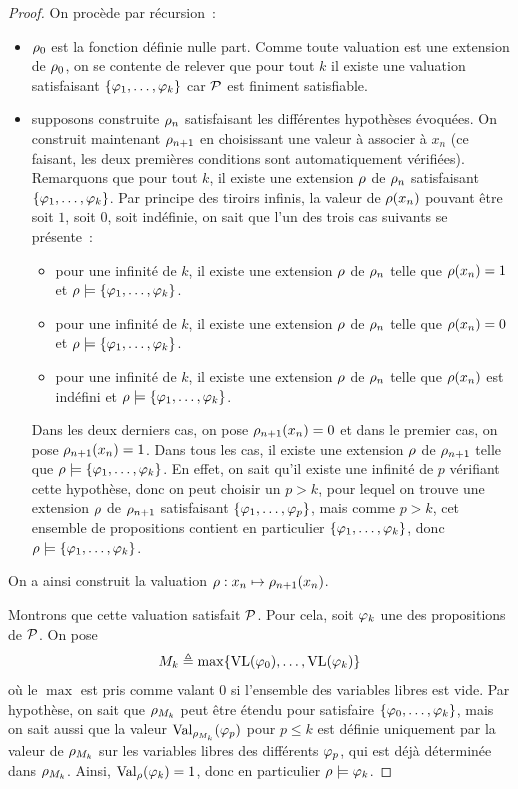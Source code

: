 \begin{proof}
  \noindent
  On procède par récursion~:
  \begin{itemize}
  \item $\rho_0$ est la fonction définie nulle part. Comme toute valuation
    est une extension de $\rho_0$, on se contente de relever que pour tout
    $k$ il existe une valuation satisfaisant $\{\varphi_1,\ldots,\varphi_k\}$
    car $\mathcal P$ est finiment satisfiable.
  \item supposons construite $\rho_n$ satisfaisant les différentes hypothèses
    évoquées. On construit maintenant $\rho_{n+1}$ en choisissant une valeur
    à associer à $x_n$ (ce faisant, les deux premières conditions sont
    automatiquement vérifiées). Remarquons que pour tout $k$, il existe une
    extension $\rho$ de $\rho_n$ satisfaisant $\{\varphi_1,\ldots,\varphi_k\}$.
    Par principe des tiroirs infinis, la valeur de $\rho(x_n)$ pouvant être soit
    $1$, soit $0$, soit indéfinie, on sait que l'un des trois cas suivants
    se présente~:
    \begin{itemize}
    \item pour une infinité de $k$, il existe une extension $\rho$ de $\rho_n$
      telle que $\rho(x_n) = 1$ et $\rho\models \{\varphi_1,\ldots,\varphi_k\}$.
    \item pour une infinité de $k$, il existe une extension $\rho$ de
      $\rho_n$ telle que $\rho(x_n) = 0$ et
      $\rho\models\{\varphi_1,\ldots,\varphi_k\}$.
    \item pour une infinité de $k$, il existe une extension $\rho$ de $\rho_n$
      telle que $\rho(x_n)$ est indéfini et
      $\rho\models\{\varphi_1,\ldots,\varphi_k\}$.
    \end{itemize}
    Dans les deux derniers cas, on pose $\rho_{n+1}(x_n) = 0$ et dans le
    premier cas, on pose $\rho_{n+1}(x_n) = 1$. Dans tous les cas,
    il existe une extension $\rho$ de $\rho_{n+1}$ telle que
    $\rho\models\{\varphi_1,\ldots,\varphi_k\}$. En effet, on sait qu'il existe
    une infinité de $p$ vérifiant cette hypothèse, donc on peut choisir
    un $p > k$, pour lequel on trouve une extension $\rho$ de $\rho_{n+1}$
    satisfaisant $\{\varphi_1,\ldots,\varphi_p\}$, mais comme $p > k$, cet
    ensemble de propositions contient en particulier
    $\{\varphi_1,\ldots,\varphi_k\}$, donc
    $\rho\models \{\varphi_1,\ldots,\varphi_k\}$.
  \end{itemize}
  On a ainsi construit la valuation $\rho : x_n \mapsto \rho_{n+1}(x_n)$.

  \noindent
  Montrons que cette valuation satisfait $\mathcal P$. Pour cela, soit
  $\varphi_k$ une des propositions de $\mathcal P$. On pose
  \[M_k \triangleq \max\{\operatorname{VL}(\varphi_0),\ldots,\operatorname{VL}(\varphi_k)\}\]
  où le $\max$ est pris comme valant $0$ si l'ensemble des variables libres est
  vide. Par hypothèse, on sait que $\rho_{M_k}$ peut être étendu pour satisfaire
  $\{\varphi_0,\ldots,\varphi_k\}$, mais on sait aussi que la valeur
  $\operatorname{Val}_{\rho_{M_k}}(\varphi_p)$ pour $p \leq k$ est définie uniquement par la
  valeur de $\rho_{M_k}$ sur les variables libres des différents $\varphi_p$, qui
  est déjà déterminée dans $\rho_{M_k}$. Ainsi, $\operatorname{Val}_{\rho}(\varphi_k) = 1$, donc en
  particulier $\rho\models \varphi_k$.


\end{proof}
